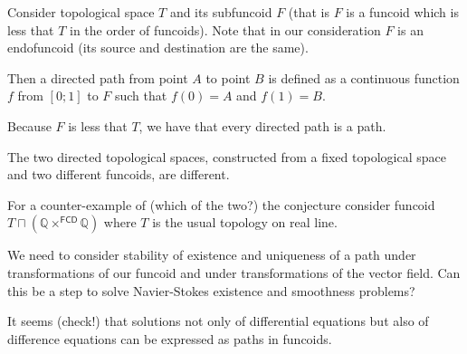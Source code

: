 Consider topological space $T$ and its subfuncoid $F$ (that is $F$ is a funcoid which is less that $T$ in the order of funcoids).
Note that in our consideration $F$ is an endofuncoid (its source and destination are the same).

Then a directed path from point $A$ to point $B$ is defined as a continuous function $f$ from $[0;1]$ to $F$ such that $f(0)=A$ and $f(1)=B$.

Because $F$ is less that $T$, we have that every directed path is a path.

\begin{conjecture}
The two directed topological spaces, constructed from a fixed topological space and two different funcoids,
are different.
\end{conjecture}

For a counter-example of (which of the two?) the conjecture consider funcoid $T\sqcap(\mathbb{Q}\times^{\mathsf{FCD}}\mathbb{Q})$
where $T$ is the usual topology on real line.

We need to consider stability of existence and uniqueness of a path under transformations of our funcoid and
under transformations of the vector field. Can this be a step to solve Navier-Stokes existence and smoothness problems?

It seems (check!) that solutions not only of differential equations but also of difference equations can be
expressed as paths in funcoids.